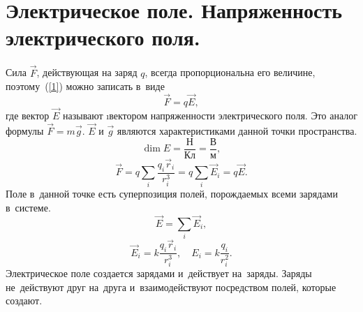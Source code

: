 \section{Электрическое поле. Напряженность \,\, электрического поля.}

	Сила $\vec{F}$, действующая на заряд $q$, всегда пропорциональна его величине, поэтому~(\ref{1}) можно записать в~виде
		$$\vec{F} = q\vec{E},$$
	где вектор $\vec{E}$ называют \i{вектором напряженности электрического поля}. Это аналог формулы $\vec{F}=m\vec{g}$. $\vec{E}$ и $\vec{g}$ являются характеристиками данной точки пространства.
		$$\dim{E}=\frac{\text{Н}}{\text{Кл}}=\frac{\text{В}}{\text{м}},$$
		$$\vec{F}=q\sum_i \frac{q_i\vec{r}_i}{r_i^3}=q\sum_i \vec{E}_i=q\vec{E}.$$
	Поле в~данной точке есть суперпозиция полей, порождаемых всеми зарядами в~системе.
		$$\vec{E}=\sum_i \vec{E}_i,$$
		$$\vec{E}_i=k\frac{q_i\vec{r}_i}{r_i^3}, \quad E_i = k\frac{q_i}{r_i^2}.$$
	Электрическое поле создается зарядами и~действует на~заряды. Заряды не~действуют друг на~друга и~взаимодействуют посредством полей, которые создают.